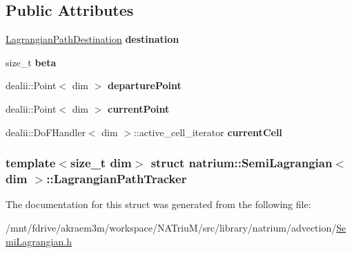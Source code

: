 \subsection*{Public Attributes}
\begin{DoxyCompactItemize}
\item 
\hypertarget{structnatrium_1_1SemiLagrangian_1_1LagrangianPathTracker_a3faec239717cc206993a27dcc5b6d582}{
\hyperlink{structnatrium_1_1SemiLagrangian_1_1LagrangianPathDestination}{LagrangianPathDestination} {\bfseries destination}}
\label{structnatrium_1_1SemiLagrangian_1_1LagrangianPathTracker_a3faec239717cc206993a27dcc5b6d582}

\item 
\hypertarget{structnatrium_1_1SemiLagrangian_1_1LagrangianPathTracker_a016f7f0cb6a4712b271d068737fefc0e}{
size\_\-t {\bfseries beta}}
\label{structnatrium_1_1SemiLagrangian_1_1LagrangianPathTracker_a016f7f0cb6a4712b271d068737fefc0e}

\item 
\hypertarget{structnatrium_1_1SemiLagrangian_1_1LagrangianPathTracker_a5f27c05c80a95777ed60e18537eacbdb}{
dealii::Point$<$ dim $>$ {\bfseries departurePoint}}
\label{structnatrium_1_1SemiLagrangian_1_1LagrangianPathTracker_a5f27c05c80a95777ed60e18537eacbdb}

\item 
\hypertarget{structnatrium_1_1SemiLagrangian_1_1LagrangianPathTracker_aaae0ec6332f1fc08d856c2cb5972a80b}{
dealii::Point$<$ dim $>$ {\bfseries currentPoint}}
\label{structnatrium_1_1SemiLagrangian_1_1LagrangianPathTracker_aaae0ec6332f1fc08d856c2cb5972a80b}

\item 
\hypertarget{structnatrium_1_1SemiLagrangian_1_1LagrangianPathTracker_a72cae75df5d769d6179afa65b0e3c242}{
dealii::DoFHandler$<$ dim $>$::active\_\-cell\_\-iterator {\bfseries currentCell}}
\label{structnatrium_1_1SemiLagrangian_1_1LagrangianPathTracker_a72cae75df5d769d6179afa65b0e3c242}

\end{DoxyCompactItemize}
\subsubsection*{template$<$size\_\-t dim$>$ struct natrium::SemiLagrangian$<$ dim $>$::LagrangianPathTracker}



The documentation for this struct was generated from the following file:\begin{DoxyCompactItemize}
\item 
/mnt/fdrive/akraem3m/workspace/NATriuM/src/library/natrium/advection/\hyperlink{SemiLagrangian_8h}{SemiLagrangian.h}\end{DoxyCompactItemize}
